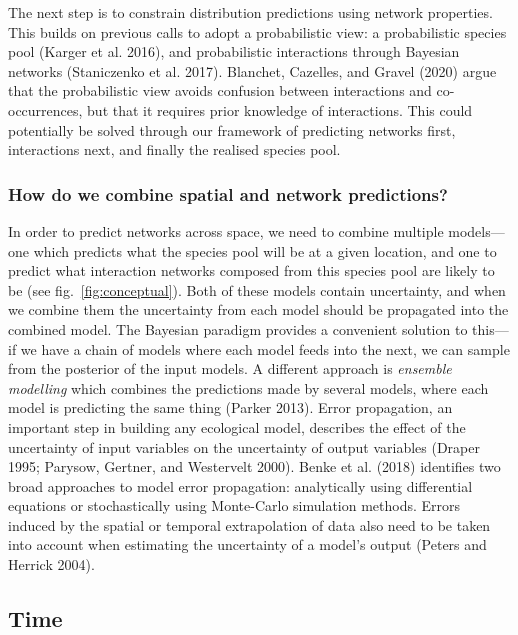 \documentclass[11pt]{article}
\begin{document}
The next step is to constrain distribution predictions using network
properties. This builds on previous calls to adopt a probabilistic view:
a probabilistic species pool (Karger et al. 2016), and probabilistic
interactions through Bayesian networks (Staniczenko et al. 2017).
Blanchet, Cazelles, and Gravel (2020) argue that the probabilistic view
avoids confusion between interactions and co-occurrences, but that it
requires prior knowledge of interactions. This could potentially be
solved through our framework of predicting networks first, interactions
next, and finally the realised species pool.

\hypertarget{how-do-we-combine-spatial-and-network-predictions}{%
\subsubsection{How do we combine spatial and network
predictions?}\label{how-do-we-combine-spatial-and-network-predictions}}

In order to predict networks across space, we need to combine multiple
models---one which predicts what the species pool will be at a given
location, and one to predict what interaction networks composed from
this species pool are likely to be (see fig.~\ref{fig:conceptual}). Both
of these models contain uncertainty, and when we combine them the
uncertainty from each model should be propagated into the combined
model. The Bayesian paradigm provides a convenient solution to this---if
we have a chain of models where each model feeds into the next, we can
sample from the posterior of the input models. A different approach is
\emph{ensemble modelling} which combines the predictions made by several
models, where each model is predicting the same thing (Parker 2013).
Error propagation, an important step in building any ecological model,
describes the effect of the uncertainty of input variables on the
uncertainty of output variables (Draper 1995; Parysow, Gertner, and
Westervelt 2000). Benke et al. (2018) identifies two broad approaches to
model error propagation: analytically using differential equations or
stochastically using Monte-Carlo simulation methods. Errors induced by
the spatial or temporal extrapolation of data also need to be taken into
account when estimating the uncertainty of a model's output (Peters and
Herrick 2004).

\hypertarget{time}{%
\subsection{Time}\label{time}}
\end{document}
